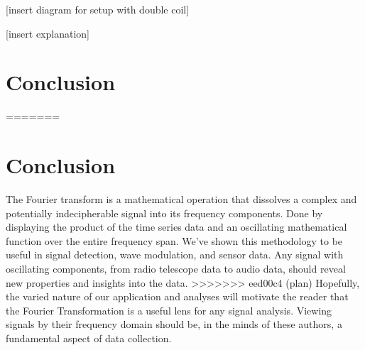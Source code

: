 \documentclass[prl,twocolumn,superscriptaddress,floatfix]{revtex4}
\begin{document}
[insert diagram for setup with double coil]

[insert explanation]
\section{Conclusion}
=======
  \section{Conclusion}
The Fourier transform is a mathematical operation that dissolves a complex and potentially indecipherable signal into its frequency components. Done by displaying the product of the time series data and an oscillating mathematical function over the entire frequency span. We've shown this methodology to be useful in signal detection, wave modulation, and sensor data. Any signal with oscillating components, from radio telescope data to audio data, should reveal new properties and insights into the data. 
>>>>>>> eed00c4 (plan)
Hopefully, the varied nature of our application and analyses will motivate the reader that the Fourier Transformation is a useful lens for any signal analysis.
Viewing signals by their frequency domain should be, in the minds of these authors, a fundamental aspect of data collection.

\nocite{Butz2015}

\end{document}
